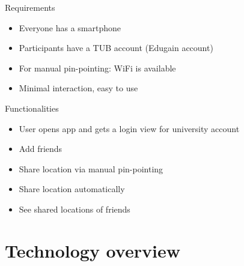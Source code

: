 \documentclass[11pt]{beamer}
\begin{document}
\begin{frame}{Requirements}

    \begin{itemize}

      \item Everyone has a smartphone
    	\item Participants have a TUB account (Edugain account)
    	\item For manual pin-pointing: WiFi is available
    	\item Minimal interaction, easy to use

    \end{itemize}

\end{frame}

\begin{frame}{Functionalities}

  \begin{itemize}
    \item User opens app and gets a login view for university account
    \item Add friends
    \item Share location via manual pin-pointing
    \item Share location automatically
    \item See shared locations of friends
  \end{itemize}


\end{frame}

\section{Technology overview}
\end{document}
